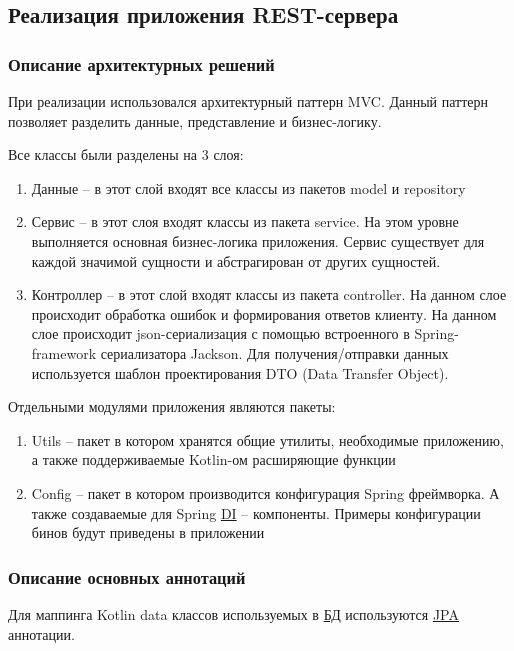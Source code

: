 \subsection{Реализация приложения REST-сервера}\label{subsec:3-impl-server}\indent

\subsubsection{Описание архитектурных решений}\indent

При реализации использовался архитектурный паттерн MVC. Данный паттерн позволяет разделить данные, представление и бизнес-логику.

Все классы были разделены на 3 слоя:
\begin{enumerate}
    \item Данные – в этот слой входят все классы из пакетов model и repository
    \item Сервис – в этот слоя входят классы из пакета service.
    На этом уровне выполняется основная бизнес-логика приложения.
    Сервис существует для каждой значимой сущности и абстрагирован от других сущностей.
    \item Контроллер – в этот слой входят классы из пакета controller.
    На данном слое происходит обработка ошибок и формирования ответов клиенту.
    На данном слое происходит json-сериализация с помощью встроенного в Spring-framework сериализатора Jackson.
    Для получения/отправки данных используется шаблон проектирования DTO (Data Transfer Object).
\end{enumerate}
Отдельными модулями приложения являются пакеты:

\begin{enumerate}
    \item Utils – пакет в котором хранятся общие утилиты, необходимые приложению, а также поддерживаемые Kotlin-ом расширяющие функции
    \item Config – пакет в котором производится конфигурация Spring фреймворка.
    А также создаваемые для Spring \hyperlink{gloss:di}{DI} – компоненты. Примеры конфигурации бинов будут приведены в приложении
\end{enumerate}

\subsubsection{Описание основных аннотаций}\indent

Для маппинга Kotlin data классов используемых в \hyperlink{gloss:db}{БД} используются \hyperlink{gloss:jpa}{JPA} аннотации.


